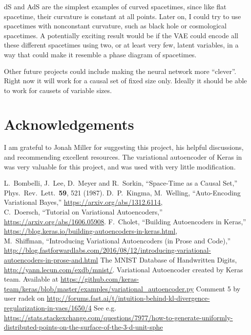 \documentclass[letterpaper,10pt]{article}
\begin{document}
dS and AdS are the simplest examples of curved spacetimes, since like flat spacetime, their curvature is constant at all points.  Later on, I could 
try to use spacetimes with nonconstant curvature, such as black hole or cosmological spacetimes.  A potentially exciting result would be if the VAE 
could encode all these different spacetimes using two, or at least very few, latent variables, in a way that could make it resemble a phase diagram of 
spacetimes.

Other future projects could include making the neural network more ``clever''.  Right now it will work for a causal set of fixed size only.  Ideally 
it should be able to work for causets of variable sizes.



\section{Acknowledgements}
I am grateful to Jonah Miller for suggesting this project, his helpful discussions, and recommending excellent resources.  
The variational autoencoder of Keras in \cite{kerasauto} was very valuable for this project, and was used with very little modification.

\begin{thebibliography}{99}
L.~Bombelli, J.~Lee, D.~Meyer and R.~Sorkin,
  ``Space-Time as a Causal Set,''
  Phys.\ Rev.\ Lett.\  {\bf 59}, 521 (1987).
D.~P.~Kingma, M.~Welling, ``Auto-Encoding Variational Bayes,'' \href{https://arxiv.org/abs/1312.6114}{https://arxiv.org/abs/1312.6114},\\
C.~Doersch, ``Tutorial on Variational Autoencoders,'' \href{https://arxiv.org/abs/1606.05908}{https://arxiv.org/abs/1606.05908}.
F.~Cholet, ``Building Autoencoders in Keras,'' \href{https://blog.keras.io/building-autoencoders-in-keras.html}{https://blog.keras.io/building-autoencoders-in-keras.html},\\
M.~Shiffman, ``Introducing Variational Autoencoders (in Prose and Code),'' \href{http://blog.fastforwardlabs.com/2016/08/12/introducing-variational-autoencoders-in-prose-and.html}
{http://blog.fastforwardlabs.com/2016/08/12/introducing-variational-autoencoders-in-prose-and.html}
 The MNIST Database of Handwritten Digits, \href{http://yann.lecun.com/exdb/mnist/}{http://yann.lecun.com/exdb/mnist/}.
 Variational Autoencoder created by Keras team. 
 Available at \href{https://github.com/keras-team/keras/blob/master/examples/variational_autoencoder.py}{https://github.com/keras-team/keras/blob/master/examples/variational\_autoencoder.py}
 Comment 5 by user radek on \href{http://forums.fast.ai/t/intuition-behind-kl-divergence-regularization-in-vaes/1650/4}
{http://forums.fast.ai/t/intuition-behind-kl-divergence-regularization-in-vaes/1650/4}
 See e.g. \href{https://stats.stackexchange.com/questions/7977/how-to-generate-uniformly-distributed-points-on-the-surface-of-the-3-d-unit-sphe}{https://stats.stackexchange.com/questions/7977/how-to-generate-uniformly-distributed-points-on-the-surface-of-the-3-d-unit-sphe}
\end{thebibliography}
\end{document}
